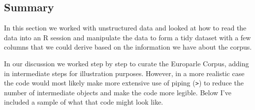 \documentclass[
  letterpaper,
]{scrbook}
\begin{document}
\hypertarget{summary-6}{%
\subsection{Summary}\label{summary-6}}

In this section we worked with unstructured data and looked at how to
read the data into an R session and manipulate the data to form a tidy
dataset with a few columns that we could derive based on the information
we have about the corpus.

In our discussion we worked step by step to curate the Europarle Corpus,
adding in intermediate steps for illustration purposes. However, in a
more realistic case the code would most likely make more extensive use
of piping (\texttt{\textbar{}\textgreater{}}) to reduce the number of
intermediate objects and make the code more legible. Below I've included
a sample of what that code might look like.
\end{document}
